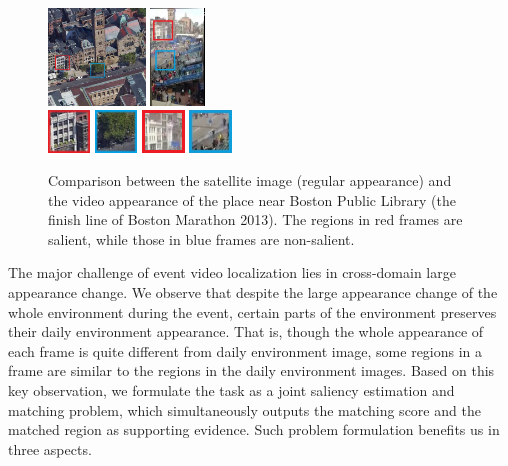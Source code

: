 \begin{figure}[htbp]
\includegraphics[width=0.23\textwidth]{img/satellite}
\includegraphics[width=0.13\textwidth]{img/video}
\\[0.1cm]
\includegraphics[width=0.10\textwidth]{img/finish_1}
\includegraphics[width=0.10\textwidth]{img/finish_2}
\includegraphics[width=0.10\textwidth]{img/finish_3}
\includegraphics[width=0.10\textwidth]{img/finish_4}
\caption{Comparison between the satellite image (regular appearance) and  the video appearance of the place near Boston Public Library (the finish line of Boston Marathon 2013). The regions in red frames are salient, while those in blue frames are non-salient.}
\label{fig:library}
\end{figure}

The major challenge of event video localization lies in cross-domain large appearance change. 
We observe that despite the large appearance change of the whole environment during the event, certain parts of the environment preserves their daily environment appearance. 
That is, though the whole appearance of each frame is quite different from daily environment image, some regions in a frame are similar to the regions in the daily environment images. 
Based on this key observation, we formulate the task as a joint saliency estimation and matching problem, which simultaneously outputs the matching score and the matched region as supporting evidence. 
Such problem formulation benefits us in three aspects.

